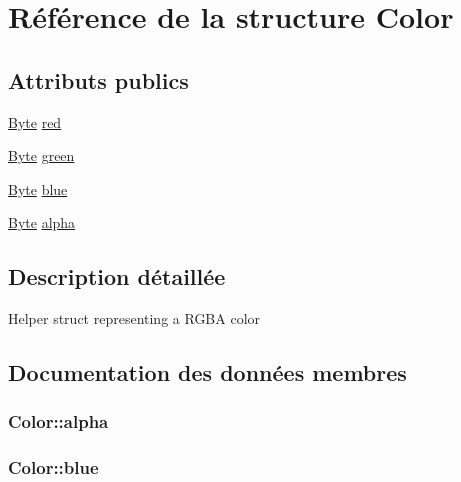 \hypertarget{struct_color}{}\section{Référence de la structure Color}
\label{struct_color}
\subsection*{Attributs publics}
\begin{DoxyCompactItemize}
\item 
\hyperlink{image_8cpp_ae3a497195d617519e5353ea7b417940f}{Byte} \hyperlink{struct_color_af84e8322aff195c692b0e5cf9ed01fe1}{red}
\item 
\hyperlink{image_8cpp_ae3a497195d617519e5353ea7b417940f}{Byte} \hyperlink{struct_color_a8a10c15fc75f5e90263b7fa4eb1c8e36}{green}
\item 
\hyperlink{image_8cpp_ae3a497195d617519e5353ea7b417940f}{Byte} \hyperlink{struct_color_ac17c1186b4303d3a1b1660efe50ebb7d}{blue}
\item 
\hyperlink{image_8cpp_ae3a497195d617519e5353ea7b417940f}{Byte} \hyperlink{struct_color_ae09a94d77a6169697f6e71a62bee5b8c}{alpha}
\end{DoxyCompactItemize}


\subsection{Description détaillée}
Helper struct representing a R\+G\+B\+A color 

\subsection{Documentation des données membres}
\hypertarget{struct_color_ae09a94d77a6169697f6e71a62bee5b8c}{}
\subsubsection[{alpha}]{ Color\+::alpha}\label{struct_color_ae09a94d77a6169697f6e71a62bee5b8c}
\hypertarget{struct_color_ac17c1186b4303d3a1b1660efe50ebb7d}{}
\subsubsection[{blue}]{ Color\+::blue}\label{struct_color_ac17c1186b4303d3a1b1660efe50ebb7d}
\hypertarget{struct_color_a8a10c15fc75f5e90263b7fa4eb1c8e36}{}
